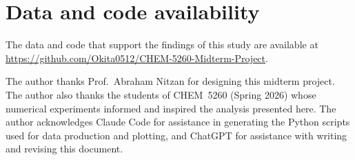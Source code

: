 \documentclass[aps,prx,reprint,showpacs,showkeys,floatfix]{revtex4-2}
\begin{document}
\section*{Data and code availability}

The data and code that support the findings of this study are available at
\url{https://github.com/Okita0512/CHEM-5260-Midterm-Project}.

\begin{acknowledgments}
The author thanks Prof.~Abraham Nitzan for designing this midterm project. The author also thanks the students of
CHEM~5260 (Spring 2026) whose numerical experiments informed and inspired
the analysis presented here. The author acknowledges Claude Code for
assistance in generating the Python scripts used for data production and
plotting, and ChatGPT for assistance with writing and revising this
document.
\end{acknowledgments}



\end{document}
